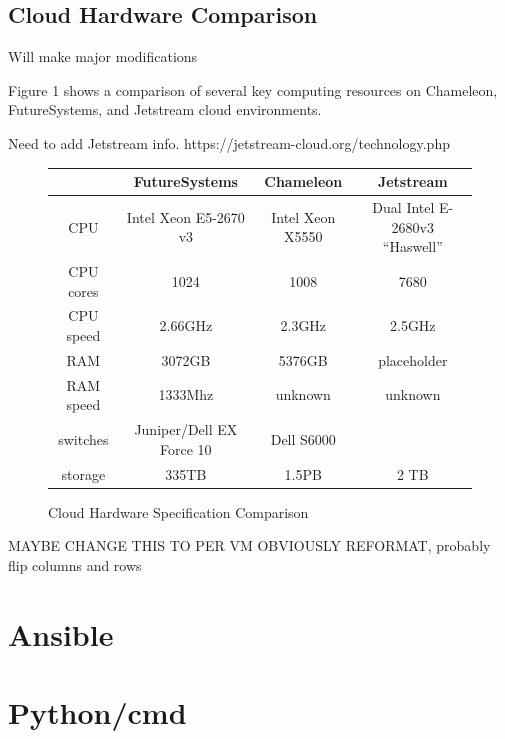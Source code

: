 \documentclass[9pt,twocolumn,twoside]{styles/osajnl}
\begin{document}
\subsection{Cloud Hardware Comparison}


Will make major modifications

Figure 1 shows a comparison of several key computing resources on Chameleon, FutureSystems, and Jetstream cloud environments.

Need to add Jetstream info.
https://jetstream-cloud.org/technology.php

\begin{figure}[ht]
\begin{center}
 \begin{tabular} {| c | c | c | c |}

 \hline
  & FutureSystems &  Chameleon  & Jetstream \\ [0.5ex] 
 \hline
 \hline
    
CPU     &    Intel Xeon E5-2670 v3 & Intel Xeon X5550 & Dual Intel E-2680v3 “Haswell” \\
 \hline
CPU cores &  1024             &        1008   &  7680 \\
 \hline
CPU speed     &   2.66GHz           &               2.3GHz & 2.5GHz\\
 \hline
RAM   &     3072GB            &               5376GB  &  placeholder\\
 \hline
RAM speed   &     1333Mhz           &               unknown & unknown\\
 \hline
switches & Juniper/Dell EX Force 10 &  Dell S6000 \\
 \hline
storage     &     335TB         &                   1.5PB  & 2 TB\\ [1ex] 
 \hline
\end{tabular}
\end{center}
  \caption{Cloud Hardware Specification Comparison} \cite{www-chamHardware} \cite{www-kiloHardware} 
\end{figure}

MAYBE CHANGE THIS TO PER VM
OBVIOUSLY REFORMAT, probably flip columns and rows

\section{Ansible}

\section{Python/cmd}
\end{document}

